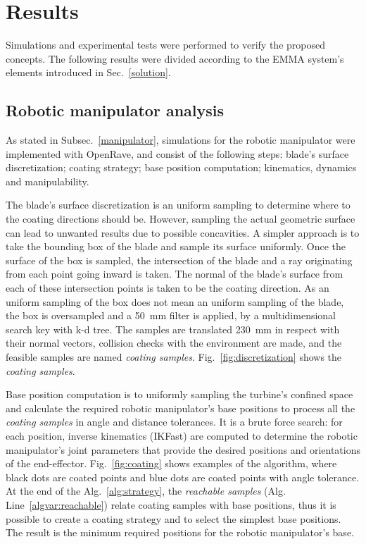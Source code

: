 \section{Results}



Simulations and experimental tests were performed to verify the proposed
concepts. The following results were divided according to the EMMA system's
elements introduced in Sec.~\ref{solution}. 


\subsection{Robotic manipulator analysis}\label{sec::man_analysis}

As stated in Subsec.~\ref{manipulator}, simulations for the robotic
manipulator were implemented with OpenRave, and consist of the following steps:
blade's surface discretization; coating strategy; base position computation;
kinematics, dynamics and manipulability.

The blade's surface discretization is an uniform sampling to
determine where to the coating directions should be. However, sampling the
actual geometric surface can lead to unwanted results due to possible
concavities. A simpler approach is to take the bounding box of the blade and
sample its surface uniformly. Once the
surface of the box is sampled, the intersection of the blade and a ray
originating from each point going inward is taken. The normal of the blade's
surface from each of these intersection points is taken to be the coating
direction. As an uniform sampling of the box does not mean an uniform sampling
of the blade, the box is oversampled and a 50~mm filter is applied, by a multidimensional search key with k-d tree.
The samples are translated 230~mm in respect with their normal vectors,
collision checks with the environment are made, and the feasible samples are
named \textit{coating samples}. Fig.~\ref{fig:discretization} shows the
\textit{coating samples}. 

Base position computation is to uniformly sampling the turbine's
confined space and calculate the required robotic manipulator's base positions
to process all the \textit{coating samples} in angle and distance tolerances.
It is a brute force search: for each position, inverse kinematics (IKFast) are
computed to determine the robotic manipulator's joint parameters that provide
the desired positions and orientations of the end-effector.
Fig.~\ref{fig:coating} shows examples of the algorithm, where black dots are
coated points and blue dots are coated points with angle tolerance. At the end
of the Alg.~\ref{alg:strategy}, the \textit{reachable samples}
(Alg. Line~\ref{algvar:reachable}) relate coating samples with base
positions, thus it is possible to create a coating strategy and to select the
simplest base positions. The result is the minimum required positions for the
robotic manipulator's base.

